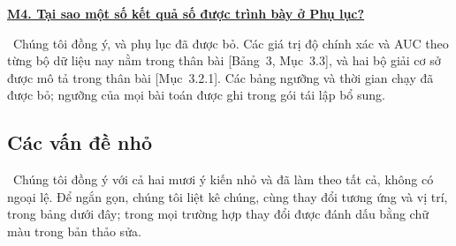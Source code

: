 \documentclass[11pt]{article}
\newcommand{\response}[1]{\smallskip\noindent{\color{blue!60!black}\textbf{Trả lời.}}\ #1\par\medskip}
\newcommand{\loc}[1]{\textcolor{blue!50!black}{[#1]}}
\newenvironment{point}[1]{\medskip\noindent\textbf{\uline{#1}}\par}{\par}
\begin{document}
\begin{point}{M4. Tại sao một số kết quả số được trình bày ở Phụ lục?}
\response{Chúng tôi đồng ý, và phụ lục đã được bỏ. Các giá trị độ chính xác và AUC theo từng bộ dữ liệu
nay nằm trong thân bài \loc{Bảng~3, Mục~3.3}, và hai bộ giải cơ sở được
mô tả trong thân bài \loc{Mục~3.2.1}. Các bảng ngưỡng và thời gian chạy đã được bỏ;
ngưỡng của mọi bài toán được ghi trong gói tái lập
bổ sung.}
\end{point}

\subsection*{Các vấn đề nhỏ}

\ Chúng tôi đồng ý với cả hai mươi ý kiến
nhỏ và đã làm theo tất cả, không có ngoại lệ. Để ngắn gọn, chúng tôi liệt kê
chúng, cùng thay đổi tương ứng và vị trí, trong bảng dưới đây; trong mọi trường hợp
thay đổi được đánh dấu bằng chữ màu trong bản thảo sửa.
\end{document}
